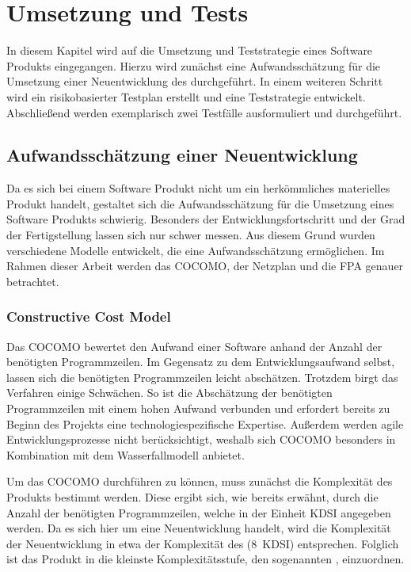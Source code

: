 \section{Umsetzung und Tests}
In diesem Kapitel wird auf die Umsetzung und Teststrategie eines Software Produkts eingegangen.
Hierzu wird zunächst eine Aufwandsschätzung für die Umsetzung einer Neuentwicklung des  durchgeführt.
In einem weiteren Schritt wird ein risikobasierter Testplan erstellt und eine Teststrategie entwickelt.
Abschließend werden exemplarisch zwei Testfälle ausformuliert und durchgeführt.

\subsection{Aufwandsschätzung einer Neuentwicklung}
Da es sich bei einem Software Produkt nicht um ein herkömmliches materielles Produkt handelt, gestaltet sich die Aufwandsschätzung für die Umsetzung eines Software Produkts schwierig.
Besonders der Entwicklungsfortschritt und der Grad der Fertigstellung lassen sich nur schwer messen.
Aus diesem Grund wurden verschiedene Modelle entwickelt, die eine Aufwandsschätzung ermöglichen.
Im Rahmen dieser Arbeit werden das \ac{COCOMO}, der Netzplan und die \ac{FPA} genauer betrachtet.

\subsubsection{Constructive Cost Model}
Das \ac{COCOMO} bewertet den Aufwand einer Software anhand der Anzahl der benötigten Programmzeilen.
Im Gegensatz zu dem Entwicklungsaufwand selbst, lassen sich die benötigten Programmzeilen leicht abschätzen.
Trotzdem birgt das Verfahren einige Schwächen.
So ist die Abschätzung der benötigten Programmzeilen mit einem hohen Aufwand verbunden und erfordert bereits zu Beginn des Projekts eine technologiespezifische Expertise.
Außerdem werden agile Entwicklungsprozesse nicht berücksichtigt, weshalb sich \ac{COCOMO} besonders in Kombination mit dem Wasserfallmodell anbietet.

\noindent{}Um das \ac{COCOMO} durchführen zu können, muss zunächst die Komplexität des Produkts bestimmt werden.
Diese ergibt sich, wie bereits erwähnt, durch die Anzahl der benötigten Programmzeilen, welche in der Einheit \ac{KDSI} angegeben werden.
Da es sich hier um eine Neuentwicklung handelt, wird die Komplexität der Neuentwicklung in etwa der Komplexität des  (8~\ac{KDSI}) entsprechen.
Folglich ist das Produkt in die kleinste Komplexitätsstufe, den sogenannten , einzuordnen.

